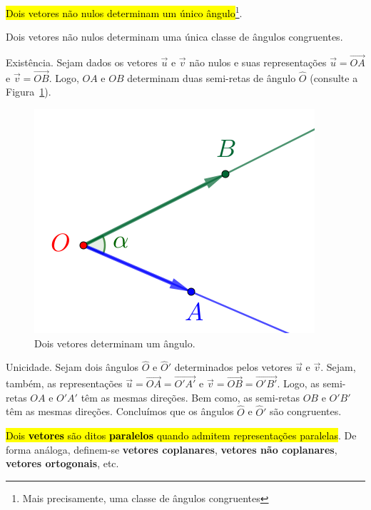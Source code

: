 \hl{Dois vetores não nulos determinam um único ângulo}\footnote{Mais precisamente, uma classe de ângulos congruentes}.

\begin{proposicao}
  Dois vetores não nulos determinam uma única classe de ângulos congruentes.
\end{proposicao}
\begin{demonstracao}
  Existência. Sejam dados os vetores $\vec{u}$ e $\vec{v}$ não nulos e suas representações $\vec{u}=\overrightarrow{OA}$ e $\vec{v}=\overrightarrow{OB}$. Logo, $OA$ e $OB$ determinam duas semi-retas de ângulo $\hat{O}$ (consulte a Figura~\ref{cap_vetor_sec_vetor:fig:vetores_e_angulos}).

  \begin{figure}[h!]
    \centering
    \includegraphics{./cap_vetor/dados/fig_vetores_e_angulos/fig.png}
    \caption{Dois vetores determinam um ângulo.}
    \label{cap_vetor_sec_vetor:fig:vetores_e_angulos}
  \end{figure}

  Unicidade. Sejam dois ângulos $\hat{O}$ e $\hat{O}'$ determinados pelos vetores $\vec{u}$ e $\vec{v}$. Sejam, também, as representações $\vec{u}=\overrightarrow{OA}=\overrightarrow{O'A'}$ e $\vec{v}=\overrightarrow{OB}=\overrightarrow{O'B'}$. Logo, as semi-retas $OA$ e $O'A'$ têm as mesmas direções. Bem como, as semi-retas $OB$ e $O'B'$ têm as mesmas direções. Concluímos que os ângulos $\hat{O}$ e $\hat{O}'$ são congruentes.
\end{demonstracao}

\hl{Dois \textbf{vetores} são ditos \textbf{paralelos} quando admitem representações paralelas}. De forma análoga, definem-se \textbf{vetores coplanares}, \textbf{vetores não coplanares}, \textbf{vetores ortogonais}, etc.

